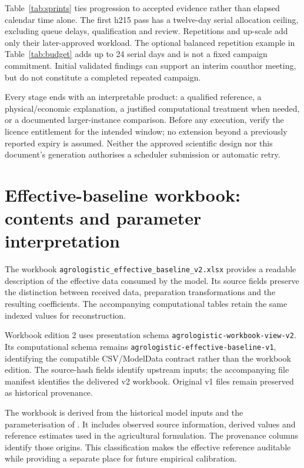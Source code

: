 \documentclass[11pt,a4paper]{article}
\newcommand{\code}[1]{{\small\texttt{#1}}}
\begin{document}
Table~\ref{tab:sprints} ties progression to accepted evidence rather than elapsed calendar time alone. The first h215 pass has a twelve-day serial allocation ceiling, excluding queue delays, qualification and review. Repetitions and up-scale add only their later-approved workload. The optional balanced repetition example in Table~\ref{tab:budget} adds up to 24 serial days and is not a fixed campaign commitment. Initial validated findings can support an interim coauthor meeting, but do not constitute a completed repeated campaign.

Every stage ends with an interpretable product: a qualified reference, a physical/economic explanation, a justified computational treatment when needed, or a documented larger-instance comparison. Before any execution, verify the licence entitlement for the intended window; no extension beyond a previously reported expiry is assumed. Neither the approved scientific design nor this document's generation authorises a scheduler submission or automatic retry.

\clearpage
\appendix
\section{Effective-baseline workbook: contents and parameter interpretation}
\label{app:data}

The workbook \code{agrologistic\_effective\_baseline\_v2.xlsx} provides a readable description of the effective data consumed by the model. Its source fields preserve the distinction between received data, preparation transformations and the resulting coefficients. The accompanying computational tables retain the same indexed values for reconstruction.

Workbook edition 2 uses presentation schema \code{\nolinkurl{agrologistic-workbook-view-v2}}. Its computational schema remains \code{\nolinkurl{agrologistic-effective-baseline-v1}}, identifying the compatible CSV/ModelData contract rather than the workbook edition. The source-hash fields identify upstream inputs; the accompanying file manifest identifies the delivered v2 workbook. Original v1 files remain preserved as historical provenance.

The workbook is derived from the historical model inputs and the parameterisation of \citet{rosa2026thesis}. It includes observed source information, derived values and reference estimates used in the agricultural formulation. The provenance columns identify those origins. This classification makes the effective reference auditable while providing a separate place for future empirical calibration.
\end{document}
